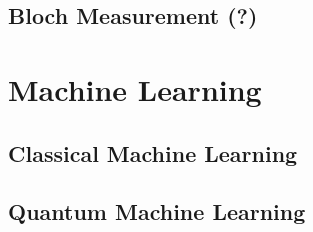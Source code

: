 \subsection{Bloch Measurement (?)}
\label{subsubsec:blochmeasurement}


\section{Machine Learning}
\label{subsec:qubitmeasurements}

\subsection{Classical Machine Learning}
\label{subsubsec:standardbasismeasurement}

\subsection{Quantum Machine Learning}
\label{subsubsec:blochmeasurement}
